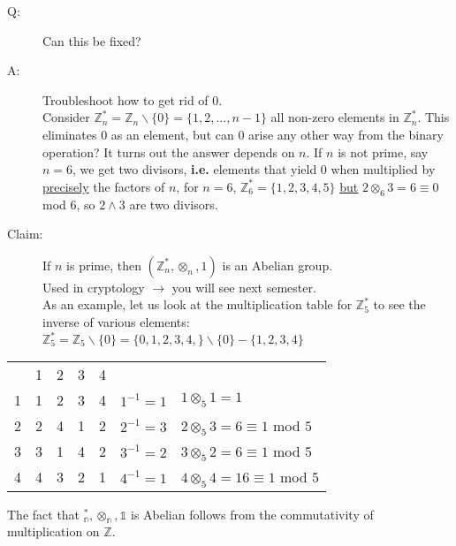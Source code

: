 \documentclass[10pt]{article}
\begin{document}
\begin{description}
\begin{description}
			\item[Q:] Can this be fixed?
			\item[A:] Troubleshoot how to get rid of 0. \\
			Consider $\mathbb{Z}_n^* = \mathbb{Z}_n \backslash \{0\} = \{1, 2, ..., n-1\}$ all non-zero elements in $\mathbb{Z}_n^*$. This eliminates 0 as an element, but can 0 arise any other way from the binary operation? It turns out the answer depends on $n$. If $n$ is not prime, say $n=6$, we get two divisors, \textbf{i.e.} elements that yield 0 when multiplied by \underline{precisely} the factors of $n$, for $n=6$, $\mathbb{Z}^*_6 = \{1, 2, 3, 4, 5\}$ \underline{but} $2 \otimes _6 3 = 6 \equiv 0$ mod $6$, so $2 \land 3$ are two divisors.
			\item[Claim:] If $n$ is prime, then $(\mathbb{Z}_n^*, \otimes _n, 1)$ is an Abelian group. \\
			Used in cryptology $\rightarrow$ you will see next semester. \\
			As an example, let us look at the multiplication table for $\mathbb{Z}_5^*$ to see the inverse of various elements: $\mathbb{Z}^*_5 = \mathbb{Z}_5 \backslash \{0\} = \{0, 1, 2, 3, 4,\} \backslash \{0\} - \{1, 2, 3, 4\}$
		\end{description}
	\end{description}
	
	\begin{center}
		\begin{tabular}[h!]{|c|cccc|rl}
			\cline{1-5}
			& 1 & 2 & 3 & 4\\ \cline{1-5}
			1 & 1 & 2 & 3 & 4 & \hspace{10mm} $1^{-1} = 1$ & $1 \otimes_5 1 = 1$ \\
			2 & 2 & 4 & 1 & 2 & \hspace{10mm} $2^{-1} = 3$ & $2 \otimes_5 3 = 6 \equiv 1$ mod $5$ \\
			3 & 3 & 1 & 4 & 2 & \hspace{10mm} $3^{-1} = 2$ & $3 \otimes_5 2 = 6 \equiv 1$ mod $5$ \\
			4 & 4 & 3 & 2 & 1 & \hspace{10mm} $4^{-1} = 1$ & $4 \otimes_5 4 = 16 \equiv 1$ mod $5$ \\
			\cline{1-5}
		\end{tabular}
	\end{center}
	The fact that $\mathbb{^*_n, \otimes _n, 1}$ is Abelian follows from the commutativity of multiplication on $\mathbb{Z}$.
	
\end{document}
